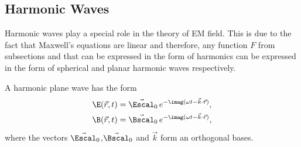 \subsection{Harmonic Waves}

Harmonic waves play a special role in the theory of \ac{EM} field.
This is due to the fact that Maxwell's equations are linear and therefore, any function \(F\) from subsections
     and  that can be expressed in the form of harmonics can be 
    expressed in the form of spherical and planar harmonic waves respectively.

A harmonic plane wave has the form
    \begin{equation}
        \begin{gathered}
            \E(\vec{r},t)=\vec{\Escal}_{0}\,e^{-\imag(\omega t-\vec{k}\cdot\vec{r})},\\
            \B(\vec{r},t)=\vec{\Bscal}_{0}\,e^{-\imag(\omega t-\vec{k}\cdot\vec{r})},
        \end{gathered}
    \end{equation}
    where the vectors \(\vec{\Escal}_0\),\(\vec{\Bscal}_0\) and \(\vec{k}\) form an orthogonal bases.





%
%


